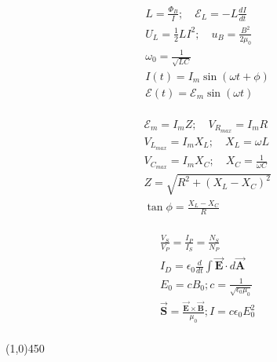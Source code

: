 \documentclass[9pt,letterpaper]{article}
\newcommand{\vect}[1]{\vec{\boldsymbol{#1}}}
\begin{document}
\vspace{-0.3in}
\begin{minipage}[t]{0.33\linewidth}
\begin{align*}
    &L=\frac{\Phi_{B}}{I}; \quad \mathcal{E}_{L} = -L\frac{dI}{dt}\\
    &U_{L} = \frac{1}{2}LI^{2}; \quad u_{B} = \frac{B^{2}}{2\mu_{0}}\\
    &\omega_{0} = \frac{1}{\sqrt{LC}}\\
    &I(t) = I_{m} \sin{(\omega t+\phi)}\\
    &\mathcal{E}(t) = \mathcal{E}_{m} \sin{(\omega t)}\\
\end{align*}
\end{minipage}
\begin{minipage}[t]{0.3\linewidth}
\begin{align*}
    &\mathcal{E}_{m} = I_{m}Z;\quad V_{R_{max}} = I_{m}R\\
    &V_{L_{max}} = I_{m}X_{L};\quad X_{L}=\omega L\\
    &V_{C_{max}} = I_{m}X_{C};\quad X_{C}=\frac{1}{\omega C}\\
    &Z = \sqrt{R^{2}+(X_{L}-X_{C})^{2}}\\
    &\tan \phi = \frac{X_{L}-X_{C}}{R}\\
\end{align*}
\end{minipage}
\begin{minipage}[t]{0.33\linewidth}
\begin{align*}
    &\frac{V_{S}}{V_{P}} = \frac{I_{P}}{I_{S}} = \frac{N_{S}}{N_{P}}\\
    &I_{D}=\epsilon_{0} \frac{d}{dt} \int \vect{E}\cdot d\vect{A}\\
    &E_{0}=cB_{0}; c=\frac{1}{\sqrt{\epsilon_{0}\mu_{0}}}\\
    &\vect{S}=\frac{\vect{E} \times \vect{B}}{\mu_{0}}; I = c\epsilon_{0}E_{0}^{2}\\
\end{align*}
\end{minipage}
\vspace{-0.3in}
\begin{center}
\line(1,0){450}
\end{center}
\end{document}

